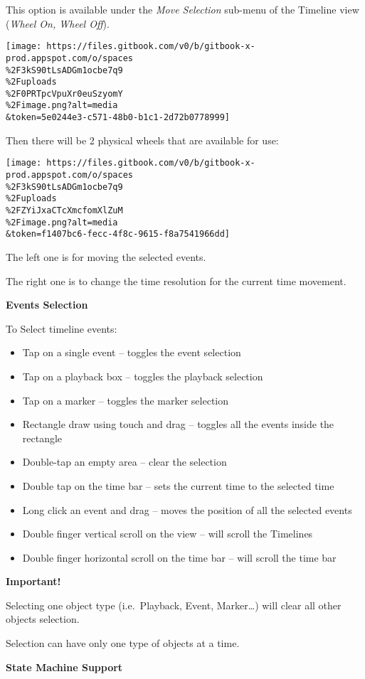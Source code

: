 \documentclass[
]{article}
\begin{document}
This option is available under the \emph{Move Selection} sub-menu of the Timeline view (\emph{Wheel On, Wheel Off}).

\texttt{[image: https://files.gitbook.com/v0/b/gitbook-x-prod.appspot.com/o/spaces\\\%2F3kS90tLsADGm1ocbe7q9\\\%2Fuploads\\\%2F0PRTpcVpuXr0euSzyomY\\\%2Fimage.png?alt=media\\\&token=5e0244e3-c571-48b0-b1c1-2d72b0778999]}

Then there will be 2 physical wheels that are available for use:

\texttt{[image: https://files.gitbook.com/v0/b/gitbook-x-prod.appspot.com/o/spaces\\\%2F3kS90tLsADGm1ocbe7q9\\\%2Fuploads\\\%2FZYiJxaCTcXmcfomXlZuM\\\%2Fimage.png?alt=media\\\&token=f1407bc6-fecc-4f8c-9615-f8a7541966dd]}

The left one is for moving the selected events.

The right one is to change the time resolution for the current time movement.

\textbf{Events Selection}

To Select timeline events:

\begin{itemize}
\item
  Tap on a single event -- toggles the event selection
\item
  Tap on a playback box -- toggles the playback selection
\item
  Tap on a marker -- toggles the marker selection
\item
  Rectangle draw using touch and drag -- toggles all the events inside the rectangle
\item
  Double-tap an empty area -- clear the selection
\item
  Double tap on the time bar -- sets the current time to the selected time
\item
  Long click an event and drag -- moves the position of all the selected events
\item
  Double finger vertical scroll on the view -- will scroll the Timelines
\item
  Double finger horizontal scroll on the time bar -- will scroll the time bar
\end{itemize}

{\textbf{Important!}}

Selecting one object type (i.e.~Playback, Event, Marker\ldots) will clear all other objects selection.

Selection can have only one type of objects at a time.

\textbf{State Machine Support}
\end{document}
